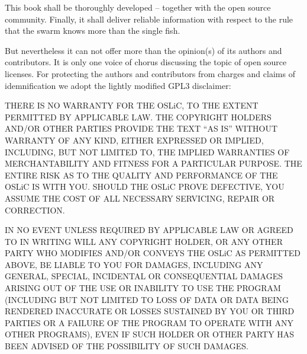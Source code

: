 %
%
%
%

%


This book shall be thoroughly developed -- together with the open source
community. Finally, it shall deliver reliable information with respect to the
rule that the swarm knows more than the single fish.

But nevertheless it can not offer more than the opinion(s) of its authors and
contributors. It is only one voice of chorus discussing the topic of open source
licenses. For protecting the authors and contributors from charges and claims of
idemnification we adopt the lightly modified GPL3 disclaimer:

THERE IS NO WARRANTY FOR THE OSLiC, TO THE EXTENT PERMITTED BY APPLICABLE LAW.
THE COPYRIGHT HOLDERS AND/OR OTHER PARTIES PROVIDE THE TEXT “AS IS” WITHOUT
WARRANTY OF ANY KIND, EITHER EXPRESSED OR IMPLIED, INCLUDING, BUT NOT LIMITED
TO, THE IMPLIED WARRANTIES OF MERCHANTABILITY AND FITNESS FOR A PARTICULAR
PURPOSE. THE ENTIRE RISK AS TO THE QUALITY AND PERFORMANCE OF THE OSLiC IS
WITH YOU. SHOULD THE OSLiC PROVE DEFECTIVE, YOU ASSUME THE COST OF ALL
NECESSARY SERVICING, REPAIR OR CORRECTION.

IN NO EVENT UNLESS REQUIRED BY APPLICABLE LAW OR AGREED TO IN WRITING WILL ANY
COPYRIGHT HOLDER, OR ANY OTHER PARTY WHO MODIFIES AND/OR CONVEYS THE OSLiC AS
PERMITTED ABOVE, BE LIABLE TO YOU FOR DAMAGES, INCLUDING ANY GENERAL, SPECIAL,
INCIDENTAL OR CONSEQUENTIAL DAMAGES ARISING OUT OF THE USE OR INABILITY TO USE
THE PROGRAM (INCLUDING BUT NOT LIMITED TO LOSS OF DATA OR DATA BEING RENDERED
INACCURATE OR LOSSES SUSTAINED BY YOU OR THIRD PARTIES OR A FAILURE OF THE
PROGRAM TO OPERATE WITH ANY OTHER PROGRAMS), EVEN IF SUCH HOLDER OR OTHER PARTY
HAS BEEN ADVISED OF THE POSSIBILITY OF SUCH DAMAGES.